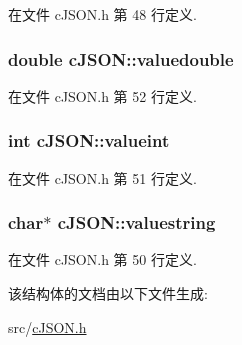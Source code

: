 在文件 c\+J\+S\+O\+N.\+h 第 48 行定义.

\hypertarget{structc_j_s_o_n_a4b21817d0fd2919901abadac73214e7f}{}
\subsubsection[{valuedouble}]{\setlength{\rightskip}{0pt plus 5cm}double c\+J\+S\+O\+N\+::valuedouble}\label{structc_j_s_o_n_a4b21817d0fd2919901abadac73214e7f}


在文件 c\+J\+S\+O\+N.\+h 第 52 行定义.

\hypertarget{structc_j_s_o_n_a369cea49494eb5d4409d532a731a0fbf}{}
\subsubsection[{valueint}]{\setlength{\rightskip}{0pt plus 5cm}int c\+J\+S\+O\+N\+::valueint}\label{structc_j_s_o_n_a369cea49494eb5d4409d532a731a0fbf}


在文件 c\+J\+S\+O\+N.\+h 第 51 行定义.

\hypertarget{structc_j_s_o_n_ad43f8de2571e504c4c5ce0a36990e6e1}{}
\subsubsection[{valuestring}]{\setlength{\rightskip}{0pt plus 5cm}char$\ast$ c\+J\+S\+O\+N\+::valuestring}\label{structc_j_s_o_n_ad43f8de2571e504c4c5ce0a36990e6e1}


在文件 c\+J\+S\+O\+N.\+h 第 50 行定义.



该结构体的文档由以下文件生成\+:\begin{DoxyCompactItemize}
\item 
src/\hyperlink{c_j_s_o_n_8h}{c\+J\+S\+O\+N.\+h}\end{DoxyCompactItemize}
